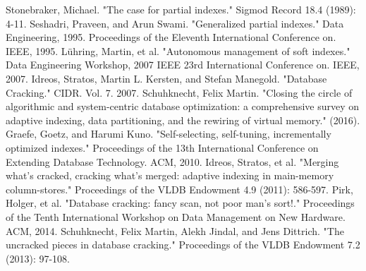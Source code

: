 \documentclass[10pt, conference, compsocconf]{IEEEtran}
\begin{document}
\begin{thebibliography}{8}

Stonebraker, Michael. "The case for partial indexes." Sigmod Record 18.4 (1989): 4-11.
Seshadri, Praveen, and Arun Swami. "Generalized partial indexes." Data Engineering, 1995. Proceedings of the Eleventh International Conference on. IEEE, 1995.
L\"uhring, Martin, et al. "Autonomous management of soft indexes." Data Engineering Workshop, 2007 IEEE 23rd International Conference on. IEEE, 2007.
Idreos, Stratos, Martin L. Kersten, and Stefan Manegold. "Database Cracking." CIDR. Vol. 7. 2007.
Schuhknecht, Felix Martin. "Closing the circle of algorithmic and system-centric database optimization: a comprehensive survey on adaptive indexing, data partitioning, and the rewiring of virtual memory." (2016).
Graefe, Goetz, and Harumi Kuno. "Self-selecting, self-tuning, incrementally optimized indexes." Proceedings of the 13th International Conference on Extending Database Technology. ACM, 2010.
Idreos, Stratos, et al. "Merging what's cracked, cracking what's merged: adaptive indexing in main-memory column-stores." Proceedings of the VLDB Endowment 4.9 (2011): 586-597.
Pirk, Holger, et al. "Database cracking: fancy scan, not poor man's sort!." Proceedings of the Tenth International Workshop on Data Management on New Hardware. ACM, 2014.
Schuhknecht, Felix Martin, Alekh Jindal, and Jens Dittrich. "The uncracked pieces in database cracking." Proceedings of the VLDB Endowment 7.2 (2013): 97-108.

\end{thebibliography}
\end{document}
